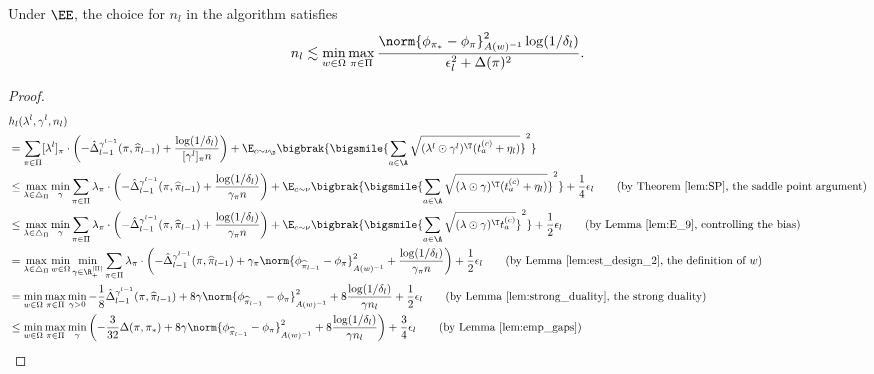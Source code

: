 \documentclass{article}
\newcommand{\pill}{\widehat{\pi}_{l-1}}
\newcommand{\1}{\mathbf{1}}
\begin{document}
\begin{lemma}\label{lem:n_l}
Under $\EE$, the choice for $n_l$ in the algorithm satisfies \[n_l\lesssim \min_{w\in\Omega}\max_{\pi\in\Pi}\frac{\norm{\phi_{\pi_*}-\phi_\pi}_{A(w)^{-1}}^2\log(1/\delta_l)}{\epsilon_l^2+\Delta(\pi)^2}.\]
\end{lemma}
\begin{proof}
{
\begingroup
\allowdisplaybreaks
\small
\begin{align*}
    &h_l(\lambda^{l},\gamma^l,n_l)\\
    &=\sum_{\pi\in\Pi}[\lambda^{l}]_\pi\cdot\left(-\hat{\Delta}_{l-1}^{\gamma^{l-1}}(\pi,\pill)+\frac{\log(1/\delta_l)}{[\gamma^l]_\pi n}\right)+\E_{c\sim\nu_\D}\bigbrak{\bigsmile{\sum_{a\in\A}\sqrt{(\lambda^{l}\odot \gamma^l)^\T (t_a^{(c)}+\eta_l)}}^2}\\
    &\leq \max_{\lambda\in\triangle_\Pi}\min_{\gamma}\sum_{\pi\in\Pi}\lambda_\pi\cdot\left(-\hat{\Delta}_{l-1}^{\gamma^{l-1}}(\pi,\pill)+\frac{\log(1/\delta_l)}{\gamma_\pi n}\right)+\E_{c\sim\nu}\bigbrak{\bigsmile{\sum_{a\in\A}\sqrt{(\lambda\odot \gamma)^\T (t_a^{(c)}+\eta_l)}}^2}+\frac{1}{4}\epsilon_l\tag{by Theorem~\ref{lem:SP}, the saddle point argument}\\
    &\leq \max_{\lambda\in\triangle_\Pi}\min_{\gamma}\sum_{\pi\in\Pi}\lambda_\pi\cdot\left(-\hat{\Delta}_{l-1}^{\gamma^{l-1}}(\pi,\pill)+\frac{\log(1/\delta_l)}{\gamma_\pi n}\right)+\E_{c\sim\nu}\bigbrak{\bigsmile{\sum_{a\in\A}\sqrt{(\lambda\odot \gamma)^\T t_a^{(c)}}}^2}+\frac{1}{2}\epsilon_l\tag{by Lemma~\ref{lem:E_9}, controlling the bias}\\ %
    &= \max_{\lambda\in\triangle_\Pi}\min_{w\in\Omega}\min_{\gamma\in\R_+^{|\Pi|}}\sum_{\pi\in\Pi}\lambda_\pi\cdot\left(-\hat{\Delta}_{l-1}^{\gamma^{l-1}}(\pi,\pill)+\gamma_\pi\norm{\phi_{\pill}-\phi_\pi}_{A(w)^{-1}}^2+\frac{\log(1/\delta_l)}{\gamma_\pi n}\right)+\frac{1}{2}\epsilon_l\tag{by Lemma~\ref{lem:est_design_2}, the definition of $w$}\\
    &= \min_{w\in\Omega}\max_{\pi\in\Pi} \min_{\gamma>0}-\frac{1}{8}\hat{\Delta}_{l-1}^{\gamma^{l-1}}(\pi,\pill)+8\gamma\norm{\phi_{\pill}-\phi_\pi}_{A(w)^{-1}}^2+8\frac{\log(1/\delta_l)}{\gamma n_l}+\frac{1}{2}\epsilon_l\tag{by Lemma~\ref{lem:strong_duality}, the strong duality}\\
    &\leq\min_{w\in\Omega} \max_{\pi\in\Pi}\min_{\gamma}\left(-\frac{3}{32}\Delta(\pi,\pi_*)+8\gamma \norm{\phi_{\pill}-\phi_\pi}_{A(w)^{-1}}^2+8\frac{\log(1/\delta_l)}{\gamma n_l}\right)+\frac{3}{4}\epsilon_l\tag{by Lemma~\ref{lem:emp_gaps}}\\

\end{align*}}
\end{proof}
\end{document}
